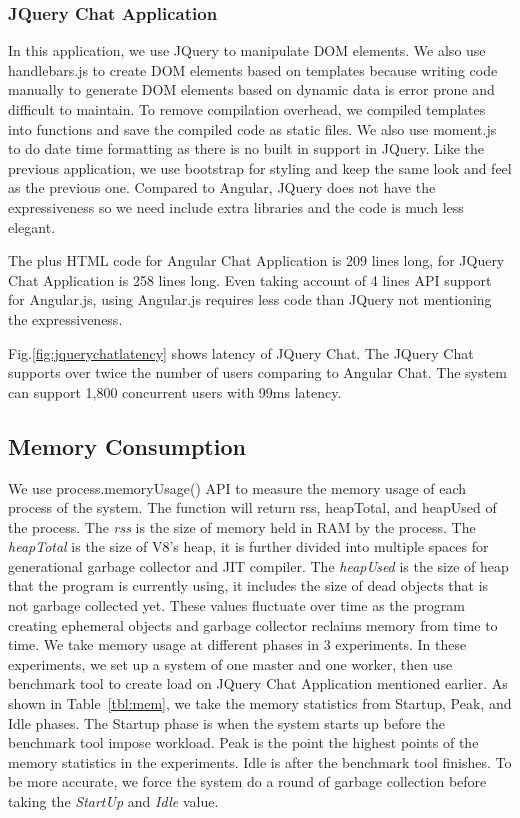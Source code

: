 \subsubsection{JQuery Chat Application}
\label{sec:jquery}
In this application, we use JQuery to manipulate DOM elements.
We also use handlebars.js to create DOM elements based on templates
because writing code manually to generate DOM elements based on dynamic data 
is error prone and difficult to maintain.
To remove compilation overhead, 
we compiled templates into \js{} functions and save the compiled code as static files.
We also use moment.js to do date time formatting as there is no built in support 
in JQuery.
Like the previous application, we use bootstrap for styling and keep the same look
and feel as the previous one.
Compared to Angular, JQuery does not have the expressiveness so we need include 
extra libraries and the code is much less elegant. 

The \js{} plus HTML code for Angular Chat Application is 209 lines long,
for JQuery Chat Application is 258 lines long.
Even taking account of 4 lines API support for Angular.js, 
using Angular.js requires less code than JQuery not mentioning the expressiveness.

Fig.\ref{fig:jquerychatlatency} shows latency of JQuery Chat.
The JQuery Chat supports over twice the number of users comparing to Angular Chat.
The system can support 1,800 concurrent users with 99ms latency.

\jquerychatlatency{}


\subsection{Memory Consumption}
We use \nodejs{} process.memoryUsage() API to measure the memory usage of each process
of the system.
The function will return rss, heapTotal, and heapUsed of the process.
The \emph{rss} is the size of memory held in RAM by the process.
The \emph{heapTotal} is the size of V8's heap, it is further divided into 
multiple spaces for generational garbage collector and JIT compiler.
The \emph{heapUsed} is the size of heap that the program is currently using,
it includes the size of dead objects that is not garbage collected yet.
These values fluctuate over time as the program creating ephemeral objects and
garbage collector reclaims memory from time to time.
We take memory usage at different phases in 3 experiments.
In these experiments, 
we set up a system of one master and one worker,
then use benchmark tool to create load on JQuery Chat Application mentioned earlier.
As shown in Table~\ref{tbl:mem}, we take the memory statistics from Startup, Peak, and Idle phases.
The Startup phase is when the system starts up before the benchmark tool impose workload.
Peak is the point the highest points of the memory statistics in the experiments.
Idle is after the benchmark tool finishes.
To be more accurate, we force the system do a round of garbage collection before taking the 
\emph{StartUp} and \emph{Idle} value.


